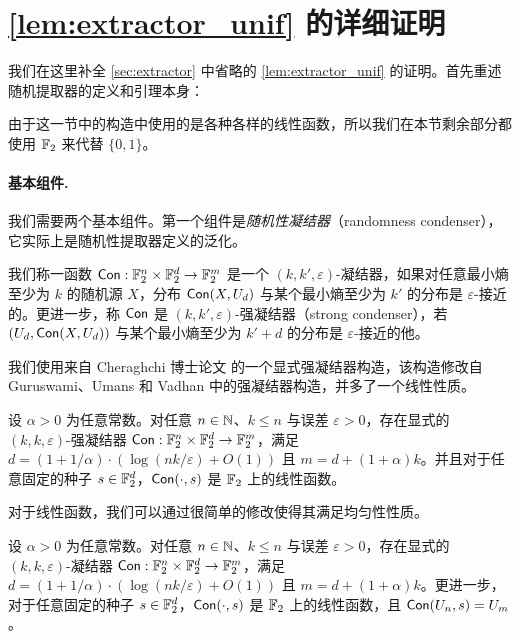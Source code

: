 \section{\cref{lem:extractor_unif} 的详细证明}\label{sec:omitted_proof_extractor}

我们在这里补全 \ref{sec:extractor} 中省略的 \cref{lem:extractor_unif} 的证明。首先重述随机提取器的定义和引理本身：

\Extractor*

\ExtractorUniform*

由于这一节中的构造中使用的是各种各样的线性函数，所以我们在本节剩余部分都使用 $\mathbb{F}_2$ 来代替 $\{0, 1\}$。

\paragraph{基本组件.}

我们需要两个基本组件。第一个组件是\emph{随机性凝结器}（randomness condenser），它实际上是随机性提取器定义的泛化。

\begin{definition}\label{def:condenser}
    我们称一函数 $\mathsf{Con} : \mathbb{F}_2^n \times \mathbb{F}_2^d \to \mathbb{F}_2^m$ 是一个 $(k, k', \varepsilon)$-凝结器，如果对任意最小熵至少为 $k$ 的随机源 $X$，分布 $\mathsf{Con}(X, U_d)$ 与某个最小熵至少为 $k'$ 的分布是 $\varepsilon$-接近的。更进一步，称 $\mathsf{Con}$ 是 $(k, k', \varepsilon)$-强凝结器（strong condenser），若 $(U_d, \mathsf{Con}(X, U_d))$ 与某个最小熵至少为 $k' + d$ 的分布是 $\varepsilon$-接近的他。
\end{definition}

我们使用来自 Cheraghchi 博士论文 \cite{Cheraghchi11_phd_thesis} 的一个显式强凝结器构造，该构造修改自 Guruswami、Umans 和 Vadhan \cite{GUV_extractor} 中的强凝结器构造，并多了一个线性性质。

\begin{lemma}\label{cor:linear_condenser_not_full_rank}
    设 $\alpha>0$ 为任意常数。对任意 $n \in \mathbb{N}$、$k \le n$ 与误差 $\varepsilon > 0$，存在显式的 $(k, k,\varepsilon)$-强凝结器 $\mathsf{Con} : \mathbb{F}_2^n \times \mathbb{F}_2^d \to \mathbb{F}_2^m$，满足 $d = (1 + 1 / \alpha) \cdot (\log (n k / \varepsilon) + O(1))$ 且 $m = d + (1 + \alpha)k$。并且对于任意固定的种子 $s \in \mathbb{F}_2^d$，$\mathsf{Con}(\cdot, s)$ 是 $\mathbb{F}_2$ 上的线性函数。
\end{lemma}

对于线性函数，我们可以通过很简单的修改使得其满足均匀性性质。

\begin{corollary}\label{cor:linear_condenser}
    设 $\alpha>0$ 为任意常数。对任意 $n \in \mathbb{N}$、$k \le n$ 与误差 $\varepsilon > 0$，存在显式的 $(k, k,\varepsilon)$-凝结器 $\mathsf{Con} : \mathbb{F}_2^n \times \mathbb{F}_2^d \to \mathbb{F}_2^m$，满足 $d = (1 + 1 / \alpha) \cdot (\log (n k / \varepsilon) + O(1))$ 且 $m = d + (1 + \alpha)k$。更进一步，对于任意固定的种子 $s \in \mathbb{F}_2^d$，$\mathsf{Con}(\cdot, s)$ 是 $\mathbb{F}_2$ 上的线性函数，且 $\mathsf{Con}(U_n, s) = U_m$。
\end{corollary}


